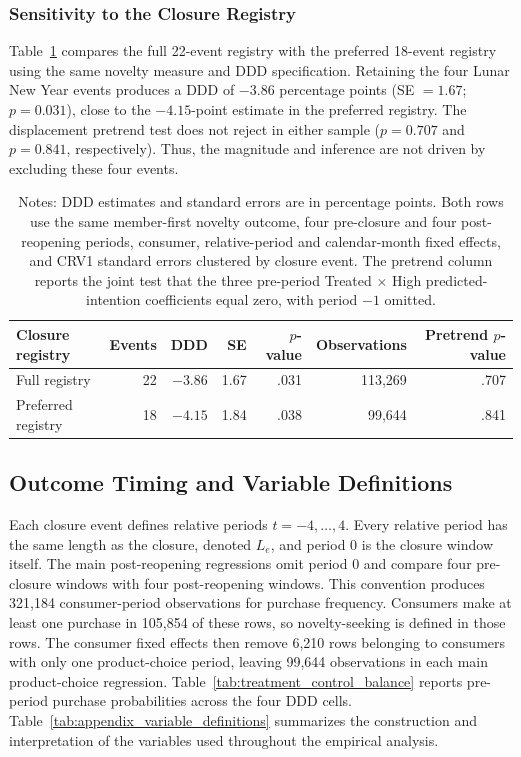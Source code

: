 \documentclass[11 pt]{article}
\newcommand\fnote[1]{\captionsetup{font=footnotesize}\caption*{#1}}
\begin{document}
\subsubsection{Sensitivity to the Closure Registry}

Table~\ref{tab:closure_registry_sensitivity} compares the full 22-event registry with the preferred 18-event registry using the same novelty measure and DDD specification. Retaining the four Lunar New Year events produces a DDD of $-3.86$ percentage points (SE $=1.67$; $p=0.031$), close to the $-4.15$-point estimate in the preferred registry. The displacement pretrend test does not reject in either sample ($p=0.707$ and $p=0.841$, respectively). Thus, the magnitude and inference are not driven by excluding these four events.

\begin{table}[!ht]
\centering
\caption{Novelty-seeking DDD across closure registries}
\label{tab:closure_registry_sensitivity}
\small
\begin{tabularx}{\textwidth}{Xrrrrrr}
\toprule
Closure registry & Events & DDD & SE & $p$-value & Observations & Pretrend $p$-value \\
\midrule
Full registry & 22 & $-3.86$ & 1.67 & .031 & 113,269 & .707 \\
Preferred registry & 18 & $-4.15$ & 1.84 & .038 & 99,644 & .841 \\
\bottomrule
\end{tabularx}
\vspace{1mm}
\fnote{Notes: DDD estimates and standard errors are in percentage points. Both rows use the same member-first novelty outcome, four pre-closure and four post-reopening periods, consumer, relative-period and calendar-month fixed effects, and CRV1 standard errors clustered by closure event. The pretrend column reports the joint test that the three pre-period Treated $\times$ High predicted-intention coefficients equal zero, with period $-1$ omitted.}
\end{table}

\subsection{Outcome Timing and Variable Definitions}
\label{app:outcome_definitions}

Each closure event defines relative periods $t=-4,\ldots,4$. Every relative period has the same length as the closure, denoted $L_e$, and period $0$ is the closure window itself. The main post-reopening regressions omit period $0$ and compare four pre-closure windows with four post-reopening windows. This convention produces 321,184 consumer-period observations for purchase frequency. Consumers make at least one purchase in 105,854 of these rows, so novelty-seeking is defined in those rows. The consumer fixed effects then remove 6,210 rows belonging to consumers with only one product-choice period, leaving 99,644 observations in each main product-choice regression. Table~\ref{tab:treatment_control_balance} reports pre-period purchase probabilities across the four DDD cells. Table~\ref{tab:appendix_variable_definitions} summarizes the construction and interpretation of the variables used throughout the empirical analysis.
\end{document}
